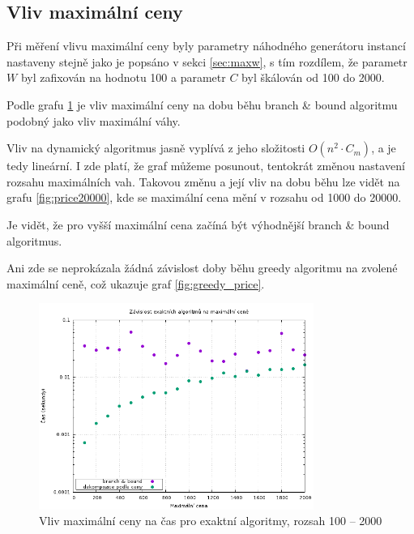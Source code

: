 \documentclass[11pt]{article}
\begin{document}
\subsection{Vliv maximální ceny}
\label{sec:maxp}

Při měření vlivu maximální ceny byly parametry náhodného generátoru instancí nastaveny stejně jako je popsáno v sekci \ref{sec:maxw}, s tím rozdílem, že parametr $W$ byl zafixován na hodnotu 100 a parametr $C$ byl škálován od 100 do 2000. 

Podle grafu \ref{fig:exact_times_price} je vliv maximální ceny na dobu běhu branch \& bound algoritmu podobný jako vliv maximální váhy.

Vliv na dynamický algoritmus jasně vyplívá z jeho složitosti $O(n^2 \cdot C_m)$, a je tedy lineární. I zde platí, že graf můžeme posunout, tentokrát změnou nastavení rozsahu maximálních vah. Takovou změnu a její vliv na dobu běhu lze vidět na grafu \ref{fig:price20000}, kde se maximální cena mění v rozsahu od 1000 do 20000.

Je vidět, že pro vyšší maximální cena začíná být výhodnější branch \& bound algoritmus.

Ani zde se neprokázala žádná závislost doby běhu greedy algoritmu na zvolené maximální ceně, což ukazuje graf \ref{fig:greedy_price}.

\begin{figure}[h!]
	\centering
    	\includegraphics[width=0.8\textwidth]{../data/max_price_times.png}
	\caption{Vliv maximální ceny na čas pro exaktní algoritmy, rozsah 100 -- 2000}
	\label{fig:exact_times_price}
\end{figure}
\end{document}
